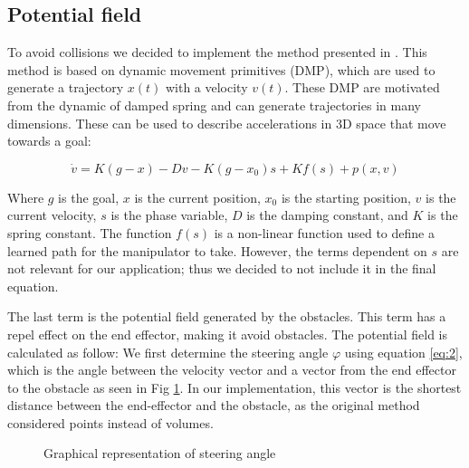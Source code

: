\documentclass[a4paper, 10pt, conference]{ieeeconf}      %
\begin{document}
\subsection{Potential field} %

To avoid collisions we decided to implement the method presented in \cite{1}. This method is based on dynamic movement primitives (DMP), which are used to generate a trajectory $x(t)$ with a velocity $v(t)$. These DMP are motivated from the dynamic of damped spring and can generate trajectories in many dimensions. These can be used to describe accelerations in 3D space that move towards a goal:

\begin{equation} \label{eq:1}
	\dot{v} = K ( g - x ) - D v - K (g - x_0) s + K f(s) + p(x, v)
\end{equation}

Where $g$ is the goal, $x$ is the current position, $x_0$ is the starting position, $v$ is the current velocity, $s$ is the phase variable, $D$ is the damping constant, and $K$ is the spring constant. The function $f(s)$ is a non-linear function used to define a learned path for the manipulator to take. However, the terms dependent on $s$ are not relevant for our application; thus we decided to not include it in the final equation.  

The last term is the potential field generated by the obstacles. This term has a repel effect on the end effector, making it avoid obstacles. The potential field is calculated as follow: We first determine the steering angle $\varphi$ using equation \ref{eq:2}, which is the angle between the velocity vector and a vector from the end effector to the obstacle as seen in Fig \ref{steering_image}. In our implementation, this vector is the shortest distance between the end-effector and the obstacle, as the original method considered points instead of volumes.


\begin{figure}
	\centering
	\caption{Graphical representation of steering angle \cite{1}}
	\label{steering_image}
\end{figure}
\end{document}

